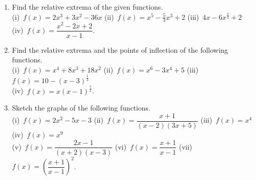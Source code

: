 \documentclass[titlepage,a4paper,12pt]{report}
\begin{document}
\begin{enumerate}
\begin{itemize}
 \item[(iii)] $\dfrac{x-1}{x}<\ln x <x-1$ for $x>1$.
 \end{itemize}
\item Find the relative extrema of the given functions.\\
(i)\, $f(x)=2x^3+3x^2-36x$ \quad (ii)\, $f(x)=x^5-\frac{5}{3}x^3+2$ \quad (iii)\, $4x-6x^{\frac{2}{3}}+2$ \\ (iv)\, $f(x)=\dfrac{x^2-2x+2}{x-1}$.
\item Find the relative extrema and the points of inflection of the following functions.\\
(i)\, $f(x)=x^4+8x^3+18x^2$ \quad (ii)\, $f(x)=x^6-3x^4+5$ \quad (iii)\, $f(x)=10-(x-3)^{\frac{1}{3}}$ \\
(iv)\, $f(x)=x(x-1)^{\frac{5}{2}}$.
\item Sketch the graphs of the following functions.\\
(i)\, $f(x)=2x^2-5x-3$ \quad (ii)\, $f(x)=\dfrac{x+1}{(x-2)(3x+5)}$ \quad (iii)\, $f(x)=x^4$ \quad (iv)\, $f(x)=x^9$\\
(v)\, $f(x)=\dfrac{2x-1}{(x+2)(x-3)}$ \quad (vi)\, $f(x)=\dfrac{x+1}{x-1}$ \quad (vii)\, $f(x)=\left(\dfrac{x+1}{x-1}\right)^2$.
\end{enumerate}
\end{document}
